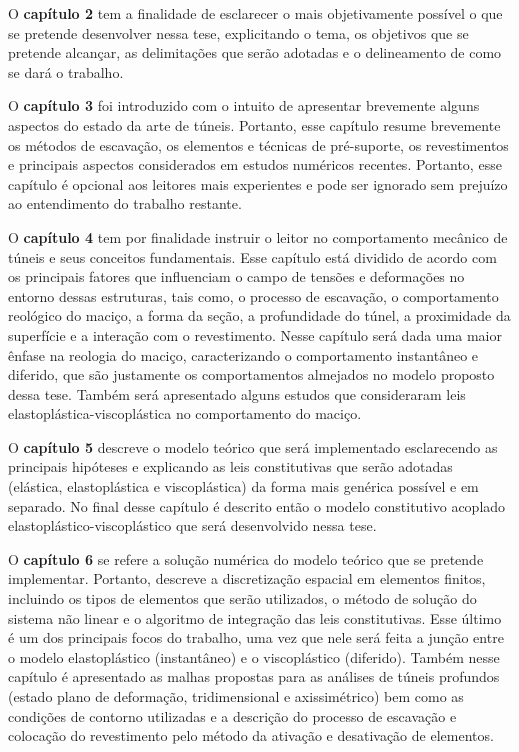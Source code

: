 O \textbf{capítulo 2} tem a finalidade de esclarecer o mais objetivamente possível o que se pretende desenvolver nessa tese, explicitando o tema, os objetivos que se pretende alcançar, as delimitações que serão adotadas e o delineamento de como se dará o trabalho.

O \textbf{capítulo 3} foi introduzido com o intuito de apresentar brevemente alguns aspectos do estado da arte de túneis. Portanto, esse capítulo resume brevemente os métodos de escavação, os elementos e técnicas de pré-suporte, os revestimentos e principais aspectos considerados em estudos numéricos recentes. Portanto, esse capítulo é opcional aos leitores mais experientes e pode ser ignorado sem prejuízo ao entendimento do trabalho restante.

O \textbf{capítulo 4} tem por finalidade instruir o leitor no comportamento mecânico de túneis e seus conceitos fundamentais. Esse capítulo está dividido de acordo com os principais fatores que influenciam o campo de tensões e deformações no entorno dessas estruturas, tais como, o processo de escavação, o comportamento reológico do maciço, a forma da seção, a profundidade do túnel, a proximidade da superfície e a interação com o revestimento. Nesse capítulo será dada uma maior ênfase na reologia do maciço, caracterizando o comportamento instantâneo e diferido, que são justamente os comportamentos almejados no modelo proposto dessa tese. Também será apresentado alguns estudos que consideraram leis elastoplástica-viscoplástica no comportamento do maciço.

O \textbf{capítulo 5} descreve o modelo teórico que será implementado esclarecendo as principais hipóteses e explicando as leis constitutivas que serão adotadas (elástica, elastoplástica e viscoplástica) da forma mais genérica possível e em separado. No final desse capítulo é descrito então o modelo constitutivo acoplado elastoplástico-viscoplástico que será desenvolvido nessa tese.

O \textbf{capítulo 6} se refere a solução numérica do modelo teórico que se pretende implementar. Portanto, descreve a discretização espacial em elementos finitos, incluindo os tipos de elementos que serão utilizados, o método de solução do sistema não linear e o algoritmo de integração das leis constitutivas. Esse último é um dos principais focos do trabalho, uma vez que nele será feita a junção entre o modelo elastoplástico (instantâneo) e o viscoplástico (diferido). Também nesse capítulo é apresentado as malhas propostas para as análises de túneis profundos (estado plano de deformação, tridimensional e axissimétrico) bem como as condições de contorno utilizadas e a descrição do processo de escavação e colocação do revestimento pelo método da ativação e desativação de elementos.

